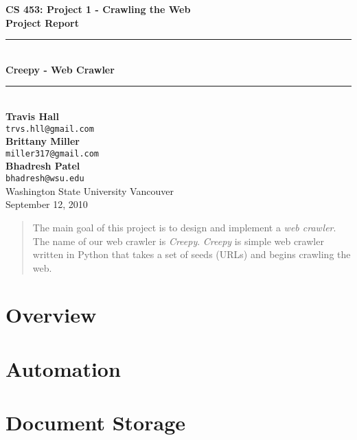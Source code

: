\documentclass[letterpaper,11pt,twoside]{article}
\begin{document}
\begin{titlepage}
   \begin{center}
       {\Large \textbf{CS 453: Project 1 - Crawling the Web}}\\[0.5cm]
       {\Large \textbf{Project Report}}\\[3.0cm]

       {\rule{\linewidth}{0.5mm}} \\[0.5cm]
       {\Huge \textbf{Creepy - Web Crawler}}\\[0.4cm] 
       {\rule{\linewidth}{0.5mm}} \\[2.0cm]

       \textbf{Travis Hall}\\
       \texttt{trvs.hll@gmail.com}\\[0.5cm]
       \textbf{Brittany Miller}\\
       \texttt{miller317@gmail.com}\\[0.5cm]
       \textbf{Bhadresh Patel}\\
       \texttt{bhadresh@wsu.edu}\\[0.5cm]

       \vfill
       Washington State University Vancouver\\
       September 12, 2010
   \end{center}
\end{titlepage}

\begin{abstract}
The main goal of this project is to design and implement a \emph{web crawler}. The name of our web crawler is \emph{Creepy}. \emph{Creepy} is simple web crawler written in Python that takes a set of seeds (URLs) and begins crawling the web.
\end{abstract}

\section{Overview}

\section{Automation}

\section{Document Storage}
\end{document}
